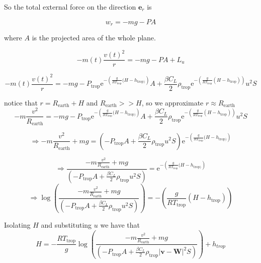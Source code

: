 \documentclass{article}
\renewcommand{\vec}[1]{\boldsymbol{#1}}
\begin{document}
So the total external force on the direction $\vec{e}_r$ is 

\begin{equation}
    w_r=-mg -PA 
\end{equation}

where $A$ is the projected area of the whole plane.

\begin{equation}
    -m(t)\frac{v(t)^2}{r}=-mg- PA +L_u
\end{equation}

\begin{equation}
     -m(t)\frac{v(t)^2}{r}=-mg-  P_{\text{trop}}\mathrm{e}^{-\left( \frac{g}{RT_{\text{trop}}}(H-h_{\text{trop})} \right)}A +\frac{\beta C_L}{2} \rho_{\text{trop}}\mathrm{e}^{-\left( \frac{g}{RT_{\text{trop}}}(H-h_{\text{trop}}) \right)} u^2S
   \end{equation}

notice that $r=R_{\text{earth}}+H$ and $R_{\text{earth}}>> H$, so we approximate $r\approx R_{\text{earth}}$
\begin{equation}
    -m\frac{v^2}{R_{\text{earth}}}= -mg-  P_{\text{trop}}\mathrm{e}^{-\left( \frac{g}{RT_{\text{trop}}}(H-h_{\text{trop})} \right)}A +\frac{\beta C_L}{2} \rho_{\text{trop}}\mathrm{e}^{-\left( \frac{g}{RT_{\text{trop}}}(H-h_{\text{trop}}) \right)} u^2S
\end{equation}

\begin{equation}
\Rightarrow     -m\frac{v^2}{R_{\text{earth}}} +mg= \left(-  P_{\text{trop}}A +\frac{\beta C_L}{2} \rho_{\text{trop}} u^2S\right) \mathrm{e}^{-\left( \frac{g}{RT_{\text{trop}}}(H-h_{\text{trop})} \right)}
\end{equation}

\begin{equation}
  \Rightarrow \frac{-m\frac{v^2}{R_{\text{earth}}} +mg}{\left(-  P_{\text{trop}}A +\frac{\beta C_L}{2} \rho_{\text{trop}} u^2S\right)}=  \mathrm{e}^{-\left( \frac{g}{RT_{\text{trop}}}(H-h_{\text{trop})} \right)}    
\end{equation}
\begin{equation}
  \Rightarrow \log \left(\frac{-m\frac{v^2}{R_{\text{earth}}} +mg}{\left(-  P_{\text{trop}}A +\frac{\beta C_L}{2} \rho_{\text{trop}} u^2S\right)}\right)=  -\left( \frac{g}{RT_{\text{trop}}}(H-h_{\text{trop}}) \right)    
\end{equation}

Isolating $H$ and substituting $u$ we have that
\begin{equation}
    H= - \frac{RT_{\text{trop}}}{g}\log \left(\frac{-m\frac{v^2}{R_{\text{earth}}} +mg}{\left(-  P_{\text{trop}}A +\frac{\beta C_L}{2} \rho_{\text{trop}} |\vec v-\vec W|^2S\right)}\right)+h_{trop}
\end{equation}
\end{document}
